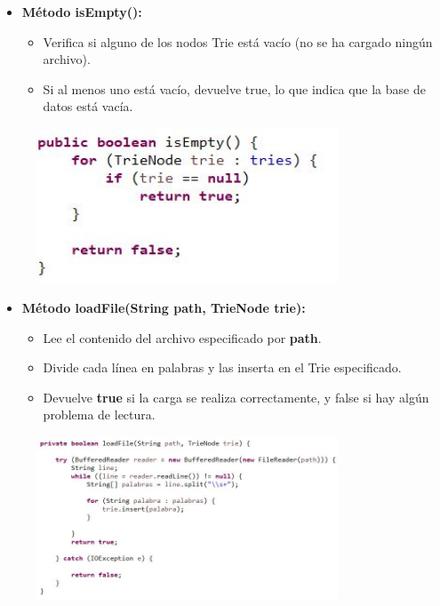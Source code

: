 \documentclass{article}
\begin{document}
	\begin{itemize}
	\item \textbf{Método isEmpty():}
	 \begin{itemize}
	 \item Verifica si alguno de los nodos Trie está vacío (no se ha cargado ningún archivo).
	 \item Si al menos uno está vacío, devuelve true, lo que indica que la base de datos está vacía.
	 \end{itemize}
	\end{itemize}
	 \begin{figure}[H]
		\centering
		\includegraphics[width=0.8\textwidth,keepaspectratio]{img/PC3.jpg}
	\end{figure}
	
	\begin{itemize}
	\item \textbf{Método loadFile(String path, TrieNode trie):}
	 \begin{itemize}
	 \item Lee el contenido del archivo especificado por \textbf{path}.
	 \item Divide cada línea en palabras y las inserta en el Trie especificado.
	 \item Devuelve \textbf{true} si la carga se realiza correctamente, y false si hay algún problema de lectura.
	 \end{itemize}
	\end{itemize}
	 \begin{figure}[H]
		\centering
		\includegraphics[width=0.8\textwidth,keepaspectratio]{img/PC4.jpg}
	\end{figure}
\clearpage		
	
\end{document}
